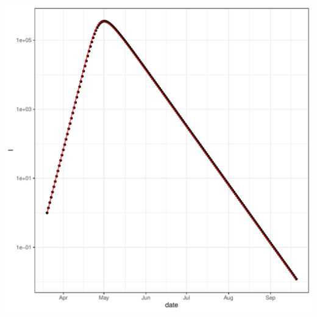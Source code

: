 \documentclass{article}\usepackage[]{graphicx}\usepackage[]{color}
\makeatletter
\def\maxwidth{ %
  \ifdim\Gin@nat@width>\linewidth
    \linewidth
  \else
    \Gin@nat@width
  \fi
}
\newenvironment{knitrout}{}{} %
\makeatother
\begin{document}
\begin{knitrout}
\includegraphics[width=\maxwidth]{figure/Try_MacPan_to_recover_the_SIR_result-3} 

\end{knitrout}
\end{document}
